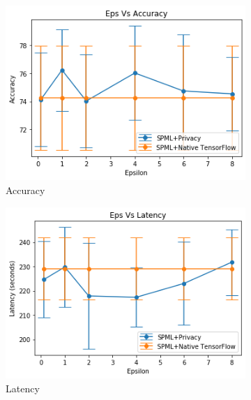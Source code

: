 \begin{figure}
     \begin{subfigure}{0.5\textwidth}
         \includegraphics[width=\textwidth]{images/RR/nativeAccuracy.png}
         \caption{Accuracy}
         \label{fig:nativeRRAccuracyInference}
     \end{subfigure}
     \begin{subfigure}{0.5\textwidth}
         \includegraphics[width=\textwidth]{images/RR/nativeLatency.png}
         \caption{Latency}
         \label{fig:nativeRRLatencyInference}
     \end{subfigure}
        \caption{Randomized response - Training - Native mode without Intel SGX and SCONE}
     \begin{subfigure}{0.5\textwidth}

\end{subfigure}
\end{figure}
